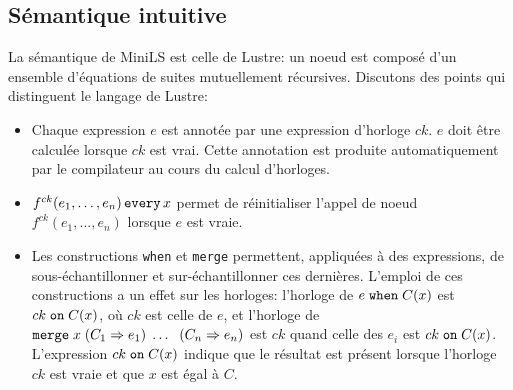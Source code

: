 \documentclass[a4paper]{article}
\newcommand{\lustre}{{\sc Lustre}}
\newcommand{\minils}{{\sc MiniLS}}
\newcommand{\mybox}[1]{\mbox{\tt{#1}}}
\newcommand{\Every}[4]{#1^{ck}(#2,\dots,#3) \, \mybox{every} \, #4}
\newcommand{\When}[3]{#1 \; \mybox{when} \; #2(#3)}
\newcommand{\Merge}[5]{\mybox{merge} \; #1 \; (#2 \Rightarrow #3) \; \dots \; \
  (#4 \Rightarrow #5)}
\newcommand{\On}[3]{#1 \; \mybox{on} \; #2 (#3)}
\begin{document}
\subsection{Sémantique intuitive}
La sémantique de \minils{} est celle de \lustre: un noeud est composé d'un ensemble
d'équations de suites mutuellement récursives. Discutons des points qui distinguent
le langage de \lustre:

\begin{itemize}
\item
Chaque expression $e$ est annotée par une expression d'horloge $ck$. $e$ doit
être calculée lorsque $ck$ est vrai. Cette annotation est produite automatiquement
par le compilateur au cours du calcul d'horloges.
\item
$\Every{f}{e_1}{e_n}{x}$ permet de réinitialiser l'appel de noeud $f^{ck}(e_1,...,e_n)$
lorsque $e$ est vraie.
\item




Les constructions \texttt{when} et \texttt{merge} permettent, appliquées à des expressions, de sous-échantillonner et sur-échantillonner ces dernières. L'emploi de ces
constructions a un effet sur les horloges: l'horloge de $\When{e}{C}{x}$ est
$\On{ck}{C}{x}$, où $ck$ est celle de $e$, et l'horloge de
$\Merge{x}{C_1}{e_1}{C_n}{e_n}$ est $ck$ quand celle des $e_i$ est
$\On{ck}{C}{x}$. L'expression $\On{ck}{C}{x}$ indique que le résultat est
présent lorsque l'horloge $ck$ est vraie et que $x$ est égal à $C$.


\end{itemize}
\end{document}
